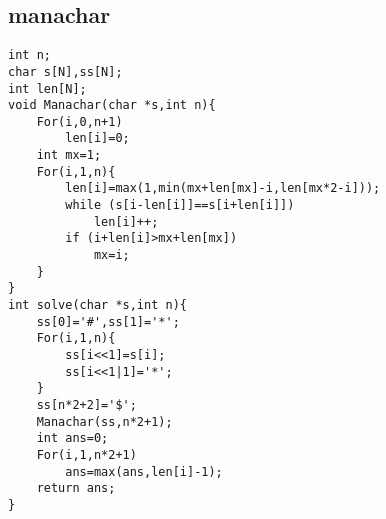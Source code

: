 \documentclass[9pt,landscape]{article}
\begin{document}
\begin{multicols}{2}
\subsection{manachar}
\begin{lstlisting}
int n;
char s[N],ss[N];
int len[N];
void Manachar(char *s,int n){
    For(i,0,n+1)
        len[i]=0;
    int mx=1;
    For(i,1,n){
        len[i]=max(1,min(mx+len[mx]-i,len[mx*2-i]));
        while (s[i-len[i]]==s[i+len[i]])
            len[i]++;
        if (i+len[i]>mx+len[mx])
            mx=i;
    }
}
int solve(char *s,int n){
    ss[0]='#',ss[1]='*';
    For(i,1,n){
        ss[i<<1]=s[i];
        ss[i<<1|1]='*';
    }
    ss[n*2+2]='$';
    Manachar(ss,n*2+1);
    int ans=0;
    For(i,1,n*2+1)
        ans=max(ans,len[i]-1);
    return ans;
}
\end{lstlisting}

\end{multicols}
\end{document}
